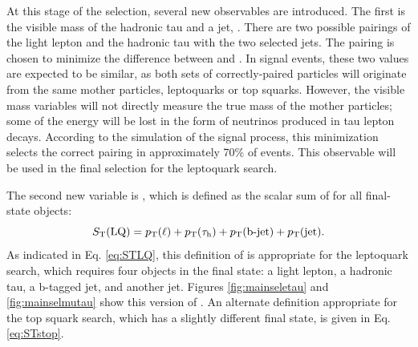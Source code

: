 At this stage of the selection, several new observables are introduced. The first is the visible mass of the hadronic tau and a jet, \MassTJ. There are two possible pairings of the light lepton and the hadronic tau with the two selected jets. The pairing is chosen to minimize the difference between \MassTJ and \MassLJ. In signal events, these two values are expected to be similar, as both sets of correctly-paired particles will originate from the same mother particles, leptoquarks or top squarks. However, the visible mass variables will not directly measure the true mass of the mother particles; some of the energy will be lost in the form of neutrinos produced in tau lepton decays. According to the simulation of the signal process, this minimization selects the correct pairing in approximately 70\% of events. This observable will be used in the final selection for the leptoquark search.

The second new variable is \ST, which is defined as the scalar sum of \pt for all final-state objects:
\begin{equation}
\label{eq:STLQ}
S_{\text{T}}(\text{LQ}) = p_{\mathrm{T}}(\ell) + p_{\mathrm{T}}(\tau_{\text{h}}) + p_{\mathrm{T}}(\text{b-jet}) + p_{\mathrm{T}}(\text{jet}).
\end{equation}
As indicated in Eq. \eqref{eq:STLQ}, this definition of \ST is appropriate for the leptoquark search, which requires four objects in the final state: a light lepton, a hadronic tau, a b-tagged jet, and another jet. Figures \ref{fig:mainseletau} and \ref{fig:mainselmutau} show this version of \ST. An alternate definition appropriate for the top squark search, which has a slightly different final state, is given in Eq. \eqref{eq:STstop}.


